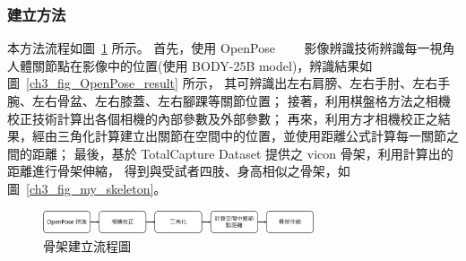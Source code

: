 \subsubsection{建立方法}
本方法流程如圖~\ref{ch3_fig_skeleton_flow} 所示。
首先，使用 OpenPose~\cite{8765346}~\cite{wei2016cpm}~\cite{simon2017hand}~\cite{cao2017realtime}
影像辨識技術辨識每一視角人體關節點在影像中的位置(使用 BODY-25B model)，辨識結果如圖~\ref{ch3_fig_OpenPose_result} 所示，
其可辨識出左右肩膀、左右手肘、左右手腕、左右骨盆、左右膝蓋、左右腳踝等關節位置；
接著，利用棋盤格方法之相機校正技術計算出各個相機的內部參數及外部參數；
再來，利用方才相機校正之結果，經由三角化計算建立出關節在空間中的位置，並使用距離公式計算每一關節之間的距離；
最後，基於 TotalCapture Dataset 提供之 vicon 骨架，利用計算出的距離進行骨架伸縮，
得到與受試者四肢、身高相似之骨架，如圖~\ref{ch3_fig_my_skeleton}。

\begin{figure}[!ht]
   \centering
   \includegraphics[width=8cm]{figure/ch3_fig_skeleton_flow.png}
    \caption[骨架建立流程圖]{骨架建立流程圖}
    \label{ch3_fig_skeleton_flow}
\end{figure}


